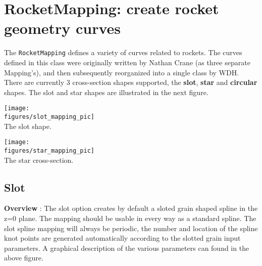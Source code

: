\section{RocketMapping: create rocket geometry curves} \label{sec:RocketMapping}

  The {\tt RocketMapping} defines a variety of curves related to rockets. The curves defined
in this class were originally written by Nathan Crane (as three separate Mapping's), and 
then subsequently reorganized into a single class by WDH. There are currently 3 cross-section
shapes supported, the {\bf slot}, {\bf star} and {\bf circular} shapes. The slot and star 
shapes are illustrated in the next figure.

\begin{minipage}{.5\linewidth}
  \begin{center}
   \texttt{[image: \\figures/slot\_mapping\_pic]}\\
  {The slot shape.}
  \end{center}
\end{minipage}
\begin{minipage}{.5\linewidth}
  \begin{center}
   \texttt{[image: \\figures/star\_mapping\_pic]}\\
  {The star cross-section.}
  \end{center}
\end{minipage}


\subsection{Slot}

{\bf Overview} : The slot option creates by default a sloted grain  shaped spline in the z=0 plane.
           The mapping should be usable in every way as a standard spline.  The slot spline mapping
           will always be periodic, the number and location of the spline knot points are
           generated automatically according to the slotted grain input parameters.  A graphical
           description of the various parameters can found in the above figure.

